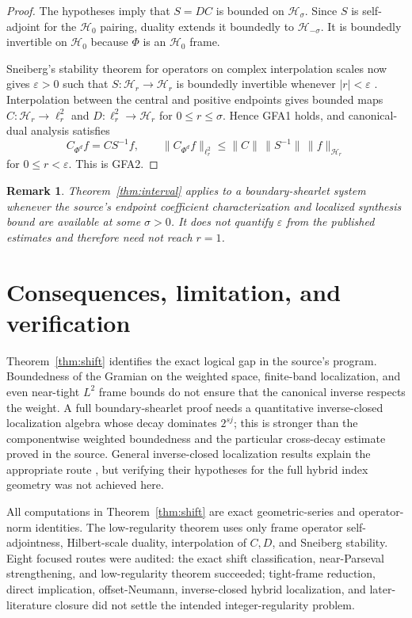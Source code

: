 \documentclass[11pt]{article}
\newtheorem{remark}[theorem]{Remark}
\begin{document}
\begin{proof}
The hypotheses imply that $S=DC$ is bounded on $\mathcal H_\sigma$. Since
$S$ is self-adjoint for the $\mathcal H_0$ pairing, duality extends it
boundedly to $\mathcal H_{-\sigma}$. It is boundedly invertible on
$\mathcal H_0$ because $\Phi$ is an $\mathcal H_0$ frame.

Sneiberg's stability theorem for operators on complex interpolation scales
now gives $\varepsilon>0$ such that
$S:\mathcal H_r\to\mathcal H_r$ is boundedly invertible whenever
$|r|<\varepsilon$ \cite{Sneiberg}. Interpolation between the central and
positive endpoints gives bounded maps
$C:\mathcal H_r\to\ell^2_r$ and
$D:\ell^2_r\to\mathcal H_r$ for $0\leq r\leq\sigma$. Hence GFA1 holds,
and canonical-dual analysis satisfies
\[
 C_{\Phi^d}f=C S^{-1}f,
 \qquad
 \|C_{\Phi^d}f\|_{\ell^2_r}
 \leq \|C\|\,\|S^{-1}\|\,\|f\|_{\mathcal H_r}
\]
for $0\leq r<\varepsilon$. This is GFA2.
\end{proof}

\begin{remark}
Theorem~\ref{thm:interval} applies to a boundary-shearlet system whenever the
source's endpoint coefficient characterization and localized synthesis bound
are available at some $\sigma>0$. It does not quantify $\varepsilon$ from
the published estimates and therefore need not reach $r=1$.
\end{remark}

\section{Consequences, limitation, and verification}

Theorem~\ref{thm:shift} identifies the exact logical gap in the source's
program. Boundedness of the Gramian on the weighted space, finite-band
localization, and even near-tight $L^2$ frame bounds do not ensure that the
canonical inverse respects the weight. A full boundary-shearlet proof needs
a quantitative inverse-closed localization algebra whose decay dominates
$2^{sj}$; this is stronger than the componentwise weighted boundedness and
the particular cross-decay estimate proved in the source. General
inverse-closed localization results explain the appropriate route
\cite{GK09,FSS19}, but verifying their hypotheses for the full hybrid index
geometry was not achieved here.

All computations in Theorem~\ref{thm:shift} are exact geometric-series and
operator-norm identities. The low-regularity theorem uses only frame
operator self-adjointness, Hilbert-scale duality, interpolation of $C,D$, and
Sneiberg stability. Eight focused routes were audited: the exact shift
classification, near-Parseval strengthening, and low-regularity theorem
succeeded; tight-frame reduction, direct implication, offset-Neumann,
inverse-closed hybrid localization, and later-literature closure did not
settle the intended integer-regularity problem.
\end{document}
